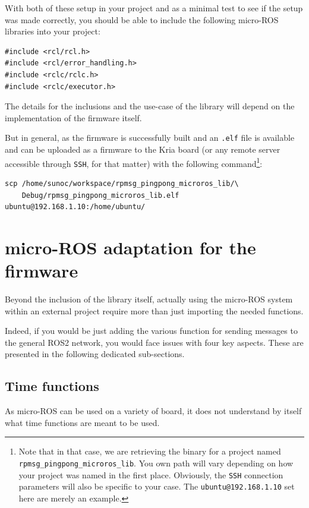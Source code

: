 \documentclass[10pt]{article}
\begin{document}
\pagebreak
With both of these setup in your project and as a minimal test to see if the setup was made correctly,
you should be able to include the following micro-ROS libraries into your project:
\begin{verbatim}
#include <rcl/rcl.h>
#include <rcl/error_handling.h>
#include <rclc/rclc.h>
#include <rclc/executor.h>
\end{verbatim}

The details for the inclusions and the use-case of the library will depend on the implementation
of the firmware itself.

But in general, as the firmware is successfully built and an \texttt{.elf} file is available and can be uploaded as a
firmware to the Kria board (or any remote server accessible through \texttt{SSH}, for that matter) with the following
command\footnote{Note that in that case, we are retrieving the binary for a project
named \texttt{rpmsg\_pingpong\_microros\_lib}.
You own path will vary depending on how your project was named in the first place.
Obviously, the \texttt{SSH} connection parameters will also be specific to your case.
The \texttt{ubuntu@192.168.1.10} set here are merely an example.}:
\begin{verbatim}
scp /home/sunoc/workspace/rpmsg_pingpong_microros_lib/\
    Debug/rpmsg_pingpong_microros_lib.elf  ubuntu@192.168.1.10:/home/ubuntu/
\end{verbatim}
\pagebreak

\section{micro-ROS adaptation for the firmware}
\label{sec:org6cc0bde}
Beyond the inclusion of the library itself, actually using the micro-ROS system
within an external project require more than just importing the needed
functions.

Indeed, if you would be just adding the various function for sending messages to
the general ROS2 network, you would face issues with four key aspects.
These are presented in the following dedicated sub-sections.

\subsection{Time functions}
\label{sec:org3fb194a}
As micro-ROS can be used on a variety of board, it does not understand by itself
what time functions are meant to be used.
\end{document}
